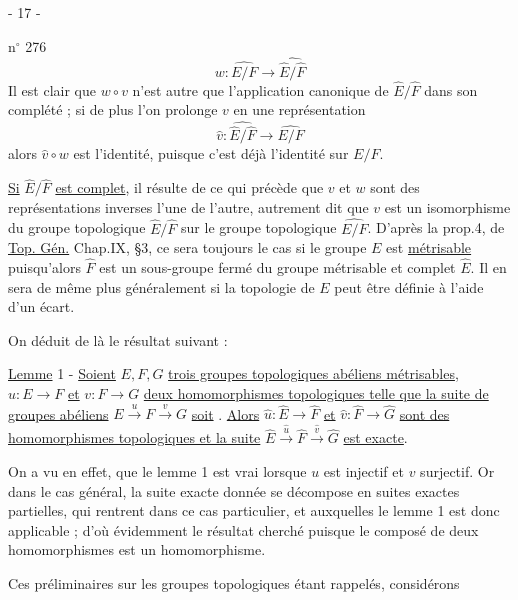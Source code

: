 \begin{center}- 17 -\end{center}
\hfill n$^\circ$ 276
\[
w:\widehat{E/F}\longrightarrow\widehat{\hat E/\hat F}
\]
Il est clair que $w\circ v$ n'est autre que l'application canonique de $\hat E/\hat F$ dans son complété ; si de plus l'on prolonge $v$ en une représentation
\[
\hat v:\widehat{\hat E/\hat F}\longrightarrow\widehat{E/F}
\]
alors $\hat v\circ w$ est l'identité, puisque c'est déjà l'identité sur $E/F$.

\uline{Si} $\hat E/\hat F$ \uline{est complet}, il résulte de ce qui précède que $v$ et $w$ sont des représentations inverses l'une de l'autre, autrement dit que $v$ est un isomorphisme du groupe topologique $\hat E/\hat F$ sur le groupe topologique $\widehat{E/F}$. D'après la prop.4, de \uline{Top. Gén.} Chap.IX, \S3, ce sera toujours le cas si le groupe $E$ est \uline{métrisable} puisqu'alors $\hat F$ est un sous-groupe fermé du groupe métrisable et complet $\hat E$. Il en sera de même plus généralement si la topologie de $E$ peut être définie à l'aide d'un écart.

On déduit de là le résultat suivant :

\uline{Lemme} 1 - \uline{Soient} $E,F,G$ \uline{trois groupes topologiques abéliens métrisables}, $u:E\longrightarrow F$ \uline{et} $v:F\longrightarrow G$ \uline{deux homomorphismes topologiques telle que la suite de groupes abéliens} $E\xrightarrow{u}F\xrightarrow{v}G$ \uline{soit} . \uline{Alors} $\hat u:\hat E\to\hat F$ \uline{et} $\hat v:\hat F\longrightarrow\hat G$ \uline{sont des homomorphismes topologiques et la suite} $\hat E\xrightarrow{\hat u}\hat F\xrightarrow{\hat v}\hat G$ \uline{est exacte}.

On a vu en effet, que le lemme 1 est vrai lorsque $u$ est injectif et $v$ surjectif. Or dans le cas général, la suite exacte donnée se décompose en suites exactes partielles,
qui rentrent dans ce cas particulier, et auxquelles le lemme 1 est donc applicable ; d'où évidemment le résultat cherché puisque le composé de deux homomorphismes est un homomorphisme.

Ces préliminaires sur les groupes topologiques étant rappelés, considérons
